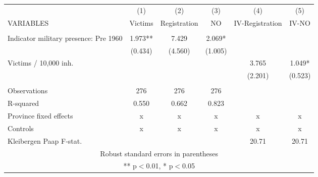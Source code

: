 \begin{tabular}{lccccc} \hline
 & (1) & (2) & (3) & (4) & (5) \\
VARIABLES & Victims & Registration & NO & IV-Registration & IV-NO \\ \hline
 &  &  &  &  &  \\
Indicator military presence: Pre 1960 & 1.973** & 7.429 & 2.069* &  &  \\
 & (0.434) & (4.560) & (1.005) &  &  \\
Victims / 10,000 inh. &  &  &  & 3.765 & 1.049* \\
 &  &  &  & (2.201) & (0.523) \\
 &  &  &  &  &  \\
Observations & 276 & 276 & 276 &  &  \\
R-squared & 0.550 & 0.662 & 0.823 &  &  \\
Province fixed effects & x & x & x & x & x \\
Controls & x & x & x & x & x \\
 Kleibergen Paap F-stat. &  &  &  & 20.71 & 20.71 \\ \hline
\multicolumn{6}{c}{ Robust standard errors in parentheses} \\
\multicolumn{6}{c}{ ** p$<$0.01, * p$<$0.05} \\
\end{tabular}
